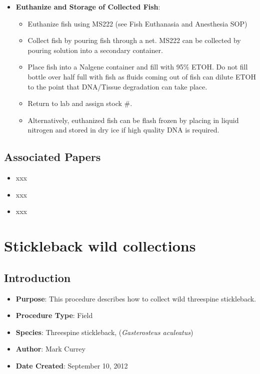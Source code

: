 \documentclass[
  letterpaper,
  DIV=11,
  numbers=noendperiod]{scrreprt}
\providecommand{\tightlist}{%
  \setlength{\itemsep}{0pt}\setlength{\parskip}{0pt}}\usepackage{longtable,booktabs,array}
\begin{document}
\begin{itemize}
\tightlist
\item
  \textbf{Euthanize and Storage of Collected Fish}:

  \begin{itemize}
  \tightlist
  \item
    Euthanize fish using MS222 (see Fish Euthanasia and Anesthesia SOP)
  \item
    Collect fish by pouring fish through a net. MS222 can be collected
    by pouring solution into a secondary container.
  \item
    Place fish into a Nalgene container and fill with 95\% ETOH. Do not
    fill bottle over half full with fish as fluids coming out of fish
    can dilute ETOH to the point that DNA/Tissue degradation can take
    place.
  \item
    Return to lab and assign stock \#.
  \item
    Alternatively, euthanized fish can be flash frozen by placing in
    liquid nitrogen and stored in dry ice if high quality DNA is
    required.
  \end{itemize}
\end{itemize}

\hypertarget{associated-papers-43}{%
\section{Associated Papers}\label{associated-papers-43}}

\begin{itemize}
\tightlist
\item
  xxx
\item
  xxx
\item
  xxx
\end{itemize}

\hypertarget{sec-vert_exp-stickleback_collections}{%
\chapter{Stickleback wild
collections}\label{sec-vert_exp-stickleback_collections}}

\hypertarget{introduction-67}{%
\section{Introduction}\label{introduction-67}}

\begin{itemize}
\tightlist
\item
  \textbf{Purpose}: This procedure describes how to collect wild
  threespine stickleback.
\item
  \textbf{Procedure Type}: Field
\item
  \textbf{Species}: Threespine stickleback, (\emph{Gasterosteus
  aculeatus})
\item
  \textbf{Author}: Mark Currey
\item
  \textbf{Date Created}: September 10, 2012
\end{itemize}
\end{document}
